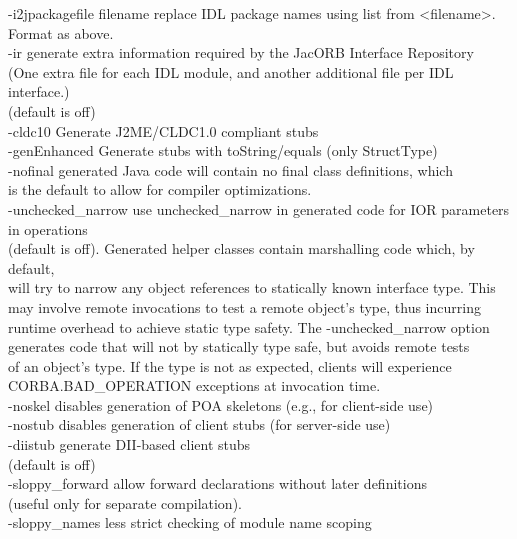 \begin{tabbing}
\> -i2jpackagefile filename \> replace IDL package names using list
from <filename>. \\
\> \> Format as above.\\
\> -ir \> generate extra information required by the JacORB Interface
Repository \\
\> \> (One extra file for each IDL module, and another additional file per IDL interface.)\\
\> \> (default is off)\\
\> -cldc10 \>Generate J2ME/CLDC1.0 compliant stubs\\
\> -genEnhanced \>Generate stubs with toString/equals (only StructType)\\
\> -nofinal  \> generated Java code will contain no final class
definitions, which\\
\> \> is the default to allow for compiler optimizations.\\
\> -unchecked\_narrow  \>  use unchecked\_narrow in generated code for IOR parameters in
 operations \\
\> \> (default is off). Generated helper classes contain marshalling code which, by
default,\\
\> \>  will try to narrow any object references to statically known interface type. This \\
\> \> may involve remote invocations to test a remote object's type, thus incurring \\
\> \> runtime overhead to achieve static type safety. The -unchecked\_narrow option\\
\> \> generates code that will not by statically type safe, but avoids
remote tests \\
\> \>  of an object's type. If the type is not as expected, clients will experience \\
\> \> CORBA.BAD\_OPERATION exceptions at invocation time.\\
\> -noskel \>disables generation of POA skeletons (e.g., for
client-side use)\\
\> -nostub \>disables generation of client stubs (for server-side use)\\
\> -diistub \>generate DII-based client stubs \\
\> \> (default is off)\\
\> -sloppy\_forward \> allow forward declarations without later
definitions\\
\> \> (useful only for separate compilation).\\
\> -sloppy\_names \> less strict checking of module name scoping

\end{tabbing}
